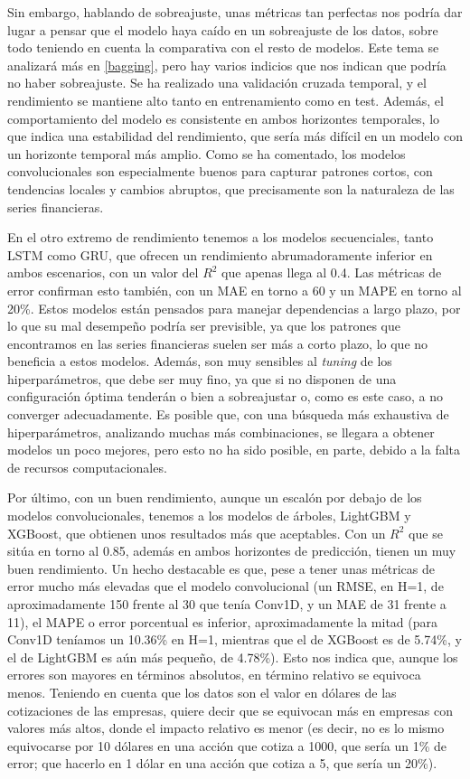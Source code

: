 \documentclass[a4paper,onecolumn]{extarticle}
\begin{document}
\begin{sloppypar}
Sin embargo, hablando de sobreajuste, unas métricas tan perfectas nos podría dar lugar a pensar que el modelo haya caído en un sobreajuste de los datos, sobre todo teniendo en 
cuenta la comparativa con el resto de modelos. Este tema se analizará más en \ref{bagging}, pero hay varios indicios que nos indican que podría no haber sobreajuste. Se ha realizado 
una validación cruzada temporal, y el rendimiento se mantiene alto tanto en entrenamiento como en test. Además, el comportamiento del modelo es consistente en ambos horizontes 
temporales, lo que indica una estabilidad del rendimiento, que sería más difícil en un modelo con un horizonte temporal más amplio. Como se ha comentado, los modelos convolucionales 
son especialmente buenos para capturar patrones cortos, con tendencias locales y cambios abruptos, que precisamente son la naturaleza de las series financieras.

En el otro extremo de rendimiento tenemos a los modelos secuenciales, tanto LSTM como GRU, que ofrecen un rendimiento abrumadoramente inferior en ambos escenarios, con un valor 
del $R^2$ que apenas llega al 0.4. Las métricas de error confirman esto también, con un MAE en torno a 60 y un MAPE en torno al 20\%. Estos modelos están pensados para manejar
dependencias a largo plazo, por lo que su mal desempeño podría ser previsible, ya que los patrones que encontramos en las series financieras suelen ser más a corto plazo, lo que 
no beneficia a estos modelos. Además, son muy sensibles al \textit{tuning} de los hiperparámetros, que debe ser muy fino, ya que si no disponen de una configuración óptima tenderán 
o bien a sobreajustar o, como es este caso, a no converger adecuadamente. Es posible que, con una búsqueda más exhaustiva de hiperparámetros, analizando muchas más combinaciones, se 
llegara a obtener modelos un poco mejores, pero esto no ha sido posible, en parte, debido a la falta de recursos computacionales.

Por último, con un buen rendimiento, aunque un escalón por debajo de los modelos convolucionales, tenemos a los modelos de árboles, LightGBM y XGBoost, que obtienen unos resultados 
más que aceptables. Con un $R^2$ que se sitúa en torno al 0.85, además en ambos horizontes de predicción, tienen un muy buen rendimiento. Un hecho destacable es que, pese a tener 
unas métricas de error mucho más elevadas que el modelo convolucional (un RMSE, en H=1, de aproximadamente 150 frente al 30 que tenía Conv1D, y un MAE de 31 frente a 11), el MAPE 
o error porcentual es inferior, aproximadamente la mitad (para Conv1D teníamos un 10.36\% en H=1, mientras que el de XGBoost es de 5.74\%, y el de LightGBM es aún más pequeño, de 
4.78\%). Esto nos indica que, aunque los errores son mayores en términos absolutos, en término relativo se equivoca menos. Teniendo en cuenta que los datos son el valor en dólares 
de las cotizaciones de las empresas, quiere decir que se equivocan más en empresas con valores más altos, donde el impacto relativo es menor (es decir, no es lo mismo equivocarse 
por 10 dólares en una acción que cotiza a 1000, que sería un 1\% de error; que hacerlo en 1 dólar en una acción que cotiza a 5, que sería un 20\%).


\end{sloppypar}
\end{document}
